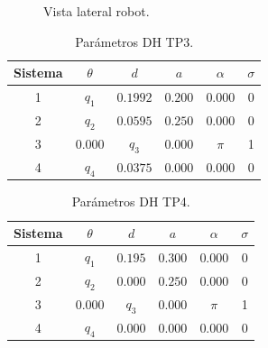 \documentclass[a4paper,12pt]{article}
\begin{document}
\begin{figure}[H]
    \centering
    \begin{adjustbox}{scale = 0.65, max width=\columnwidth}
    \end{adjustbox}
    \caption{Vista lateral robot.}
    \label{vista lateral}
\end{figure}

\begin{table}[H]
    \centering
    \begin{tabular}{|c|c|c|c|c|c|}
    \hline
    Sistema & $\theta$  & $d$           & $a$      & $\alpha$ & $\sigma$ \\ \hline
    1       & $q_1$     & $0.1992$      & $0.200$  & 0.000    & 0        \\ \hline
    2       & $q_2$     & $0.0595$      & $0.250$  & 0.000    & 0        \\ \hline
    3       & $0.000$   & $q_3$         & $0.000$  & $\pi$      & 1        \\ \hline
    4       & $q_4$     & $0.0375$      & $0.000$  & 0.000    & 0        \\ \hline
    \end{tabular}
    \caption{Parámetros DH TP3.}
    \label{DH TP3}
\end{table}

\begin{table}[H]
    \centering
    \begin{tabular}{|c|c|c|c|c|c|}
    \hline
    Sistema & $\theta$  & $d$           & $a$      & $\alpha$ & $\sigma$ \\ \hline
    1       & $q_1$     & $0.195$       & $0.300$  & 0.000    & 0        \\ \hline
    2       & $q_2$     & $0.000$       & $0.250$  & 0.000    & 0        \\ \hline
    3       & $0.000$   & $q_3$         & $0.000$  & $\pi$      & 1        \\ \hline
    4       & $q_4$     & $0.000$       & $0.000$  & 0.000    & 0        \\ \hline
    \end{tabular}
    \caption{Parámetros DH TP4.}
    \label{DH TP4}
\end{table}
\end{document}
